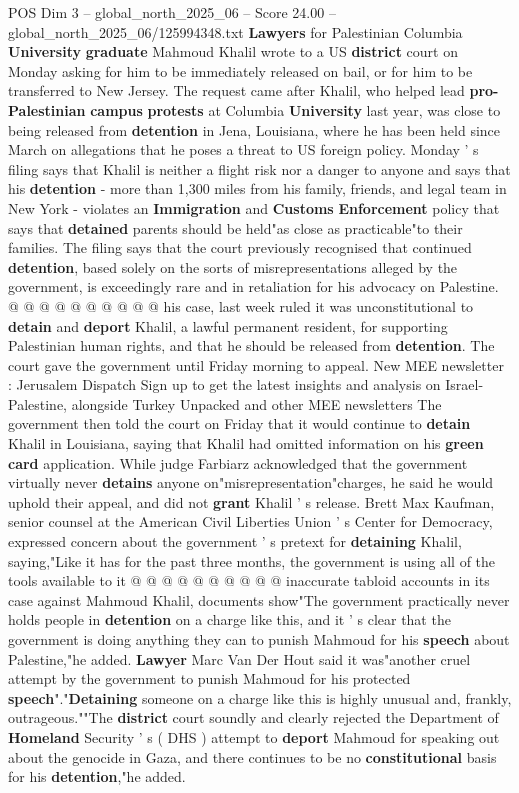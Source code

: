 \begin{textsample}{POS Dim 3 – global\_north\_2025\_06 – Score 24.00 – global\_north\_2025\_06/125994348.txt}  \label{ex:f3_pos_106}
\textbf{Lawyers} for Palestinian Columbia \textbf{University} \textbf{graduate} Mahmoud Khalil wrote to a US \textbf{district} court on Monday asking for him to be immediately released on bail, or for him to be transferred to New Jersey.
The request came after Khalil, who helped lead \textbf{pro-Palestinian} \textbf{campus} \textbf{protests} at Columbia \textbf{University} last year, was close to being released from \textbf{detention} in Jena, Louisiana, where he has been held since March on allegations that he poses a threat to US foreign policy.
Monday ' s filing says that Khalil is neither a flight risk nor a danger to anyone and says that his \textbf{detention} - more than 1,300 miles from his family, friends, and legal team in New York - violates an \textbf{Immigration} and \textbf{Customs} \textbf{Enforcement} policy that says that \textbf{detained} parents should be held"as close as practicable"to their families.
The filing says that the court previously recognised that continued \textbf{detention}, based solely on the sorts of misrepresentations alleged by the government, is exceedingly rare and in retaliation for his advocacy on Palestine. @ @ @ @ @ @ @ @ @ @ his case, last week ruled it was unconstitutional to \textbf{detain} and \textbf{deport} Khalil, a lawful permanent resident, for supporting Palestinian human rights, and that he should be released from \textbf{detention}.
The court gave the government until Friday morning to appeal.
New MEE newsletter : Jerusalem Dispatch Sign up to get the latest insights and analysis on Israel-Palestine, alongside Turkey Unpacked and other MEE newsletters The government then told the court on Friday that it would continue to \textbf{detain} Khalil in Louisiana, saying that Khalil had omitted information on his \textbf{green} \textbf{card} application.
While judge Farbiarz acknowledged that the government virtually never \textbf{detains} anyone on"misrepresentation"charges, he said he would uphold their appeal, and did not \textbf{grant} Khalil ' s release.
Brett Max Kaufman, senior counsel at the American Civil Liberties Union ' s Center for Democracy, expressed concern about the government ' s pretext for \textbf{detaining} Khalil, saying,"Like it has for the past three months, the government is using all of the tools available to it @ @ @ @ @ @ @ @ @ @ inaccurate tabloid accounts in its case against Mahmoud Khalil, documents show"The government practically never holds people in \textbf{detention} on a charge like this, and it ' s clear that the government is doing anything they can to punish Mahmoud for his \textbf{speech} about Palestine,"he added. \textbf{Lawyer} Marc Van Der Hout said it was"another cruel attempt by the government to punish Mahmoud for his protected \textbf{speech}"."\textbf{Detaining} someone on a charge like this is highly unusual and, frankly, outrageous.""The \textbf{district} court soundly and clearly rejected the Department of \textbf{Homeland} Security ' s ( DHS ) attempt to \textbf{deport} Mahmoud for speaking out about the genocide in Gaza, and there continues to be no \textbf{constitutional} basis for his \textbf{detention},"he added.

\end{textsample}
